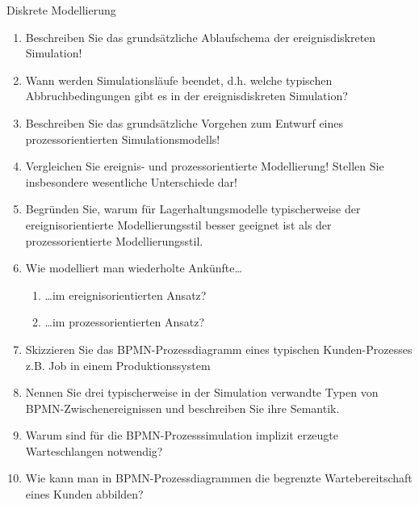 \documentclass{article}
\begin{document}
\begin{exercise}{Diskrete Modellierung}
  \begin{enumerate}
    \item Beschreiben Sie das grundsätzliche Ablaufschema der ereignisdiskreten Simulation!
    \item Wann werden Simulationsläufe beendet, d.h. welche typischen Abbruchbedingungen gibt es in der ereignisdiskreten Simulation?
    \item Beschreiben Sie das grundsätzliche Vorgehen zum Entwurf eines prozessorientierten Simulationsmodells!
    \item Vergleichen Sie ereignis- und prozessorientierte Modellierung! Stellen Sie insbesondere wesentliche Unterschiede dar!
    \item Begründen Sie, warum für Lagerhaltungsmodelle typischerweise der ereignisorientierte Modellierungsstil besser geeignet ist als der prozessorientierte Modellierungsstil.
    \item Wie modelliert man wiederholte Ankünfte…
          \begin{enumerate}
            \item …im ereignisorientierten Ansatz?
            \item …im prozessorientierten Ansatz?
          \end{enumerate}
    \item Skizzieren Sie das BPMN-Prozessdiagramm eines typischen Kunden-Prozesses z.B. Job in einem Produktionssystem
    \item Nennen Sie drei typischerweise in der Simulation verwandte Typen von BPMN-Zwischenereignissen und beschreiben Sie ihre Semantik.
    \item Warum sind für die BPMN-Prozesssimulation implizit erzeugte Warteschlangen notwendig?
    \item Wie kann man in BPMN-Prozessdiagrammen die begrenzte Wartebereitschaft eines Kunden abbilden?
  \end{enumerate}


\end{exercise}
\end{document}
